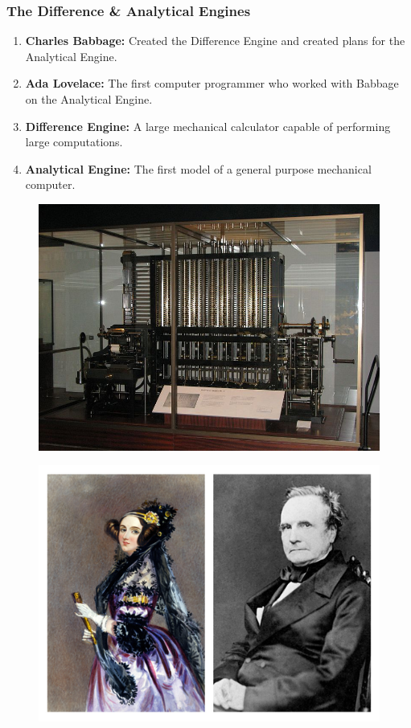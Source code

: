 \documentclass{beamer}
\begin{document}
%
%
\begin{frame}
  \frametitle{The Difference \& Analytical Engines}
  \begin{minipage}{0.59\textwidth}
    \begin{enumerate}
      \item \textbf{Charles Babbage: } Created the Difference Engine and created plans for the Analytical Engine.
      \item \textbf{Ada Lovelace: } The first computer programmer who worked with Babbage on the Analytical Engine.
      \item \textbf{Difference Engine: } A large mechanical calculator capable of performing large computations.
      \item \textbf{Analytical Engine: } The first model of a general purpose mechanical computer.
    \end{enumerate}
    \hfill
  \end{minipage}
  \begin{minipage}{0.39\textwidth}
    \centering
    \begin{figure}
      \includegraphics[width=.80\textwidth]{./imgs/differenceengine.jpg}
      \label{fig:analyticalengine.png}
    \end{figure}
    \begin{figure}
      \includegraphics[width=.87\textwidth]{imgs/adababbage.png}
      \label{fig:adababbage.png}
    \end{figure}
  \end{minipage}
\end{frame}
\end{document}
